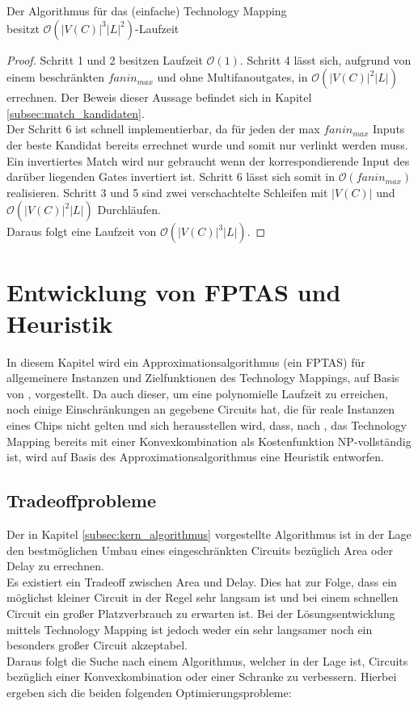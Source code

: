 \documentclass[11pt, a4paper, german]{article}
\newcommand{\TM}{Technology  Mapping }
\begin{document}
\begin{cor}{Der Algorithmus für das (einfache) \TM  \\ besitzt $\mathcal{O}(  |V(C)|^3|L|^2)$-Laufzeit}
\end{cor}
\begin{proof}
Schritt 1 und 2 besitzen Laufzeit $\mathcal{O}(1)$. Schritt 4 lässt sich, aufgrund von einem beschränkten $fanin_{max}$ und ohne Multifanoutgates, in $\mathcal{O}(|V(C)|^2|L|)$ errechnen. Der Beweis dieser Aussage befindet sich in Kapitel \ref{subsec:match_kandidaten}.\\
Der Schritt 6 ist schnell implementierbar, da für jeden der max $fanin_{max}$ Inputs der beste Kandidat bereits errechnet wurde und somit nur verlinkt werden muss. Ein invertiertes Match wird nur gebraucht wenn der korrespondierende Input des darüber liegenden Gates invertiert ist. Schritt 6 lässt sich somit in  $\mathcal{O}(fanin_{max})$ realisieren. Schritt 3 und 5 sind zwei verschachtelte Schleifen mit  $|V(C)|$ und $\mathcal{O}(|V(C)|^2|L|)$ Durchläufen. \\
Daraus folgt eine Laufzeit von $\mathcal{O}(  |V(C)|^3|L|)$.
\end{proof}



\section{Entwicklung von FPTAS und Heuristik}
\label{sec:allg_algorithmus}
In diesem Kapitel wird ein Approximationsalgorithmus (ein FPTAS) für allgemeinere Instanzen und Zielfunktionen des Technology Mappings, auf Basis von \cite{Elbert}, vorgestellt. Da auch dieser, um eine polynomielle Laufzeit zu erreichen, noch einige Einschränkungen an gegebene Circuits hat, die für reale Instanzen eines Chips nicht gelten und sich herausstellen wird, dass, nach \cite{ComplexitySynthesis}, das \TM bereits mit einer Konvexkombination als Kostenfunktion  NP-vollständig ist, wird auf Basis des Approximationsalgorithmus eine Heuristik entworfen.

\subsection{Tradeoffprobleme}
\label{subsec:tradeoffprobleme}
Der in Kapitel \ref{subsec:kern_algorithmus} vorgestellte Algorithmus ist in der Lage den bestmöglichen Umbau eines eingeschränkten Circuits bezüglich Area oder Delay zu errechnen. \\
Es existiert  ein Tradeoff zwischen Area und Delay. Dies hat zur Folge, dass ein möglichst kleiner Circuit in der Regel sehr langsam ist und  bei einem schnellen Circuit ein großer Platzverbrauch zu erwarten ist. 
Bei der Lösungsentwicklung mittels \TM  ist jedoch weder ein sehr langsamer noch ein besonders großer Circuit akzeptabel.\\
Daraus folgt die Suche nach einem Algorithmus, welcher in der Lage ist, Circuits  bezüglich einer Konvexkombination oder einer Schranke zu verbessern. Hierbei ergeben sich die beiden folgenden Optimierungsprobleme: 
\end{document}
